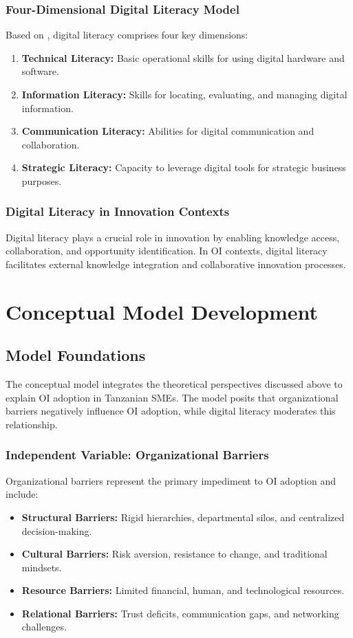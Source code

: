 \subsubsection{Four-Dimensional Digital Literacy Model}
Based on \cite{eshet2004digital}, digital literacy comprises four key dimensions:
\begin{enumerate}
    \item \textbf{Technical Literacy:} Basic operational skills for using digital hardware and software.
    \item \textbf{Information Literacy:} Skills for locating, evaluating, and managing digital information.
    \item \textbf{Communication Literacy:} Abilities for digital communication and collaboration.
    \item \textbf{Strategic Literacy:} Capacity to leverage digital tools for strategic business purposes.
\end{enumerate}

\subsubsection{Digital Literacy in Innovation Contexts}
Digital literacy plays a crucial role in innovation by enabling knowledge access, collaboration, and opportunity identification. In OI contexts, digital literacy facilitates external knowledge integration and collaborative innovation processes.

\section{Conceptual Model Development}

\subsection{Model Foundations}

The conceptual model integrates the theoretical perspectives discussed above to explain OI adoption in Tanzanian SMEs. The model posits that organizational barriers negatively influence OI adoption, while digital literacy moderates this relationship.

\subsubsection{Independent Variable: Organizational Barriers}
Organizational barriers represent the primary impediment to OI adoption and include:
\begin{itemize}
    \item \textbf{Structural Barriers:} Rigid hierarchies, departmental silos, and centralized decision-making.
    \item \textbf{Cultural Barriers:} Risk aversion, resistance to change, and traditional mindsets.
    \item \textbf{Resource Barriers:} Limited financial, human, and technological resources.
    \item \textbf{Relational Barriers:} Trust deficits, communication gaps, and networking challenges.
\end{itemize}

